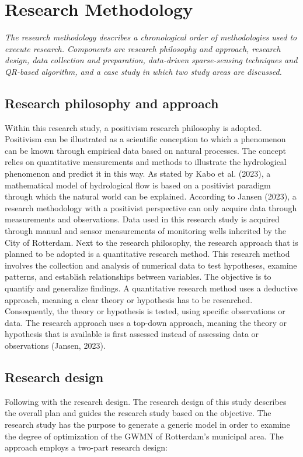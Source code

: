 \chapter{Research Methodology}
\emph{The research methodology describes a chronological order of methodologies used to execute research. Components are research philosophy and approach, research design, data collection and preparation, data-driven sparse-sensing techniques and QR-based algorithm, and a case study in which two study areas are discussed.}

\section{Research philosophy and approach}

Within this research study, a positivism research philosophy is adopted. Positivism can be illustrated as a scientific conception to which a phenomenon can be known through empirical data based on natural processes. The concept relies on quantitative measurements and methods to illustrate the hydrological phenomenon and predict it in this way. As stated by Kabo et al. (2023), a mathematical model of hydrological flow is based on a positivist paradigm through which the natural world can be explained. According to Jansen (2023), a research methodology with a positivist perspective can only acquire data through measurements and observations. Data used in this research study is acquired through manual and sensor measurements of monitoring wells inherited by the City of Rotterdam. Next to the research philosophy, the research approach that is planned to be adopted is a quantitative research method. This research method involves the collection and analysis of numerical data to test hypotheses, examine patterns, and establish relationships between variables. The objective is to quantify and generalize findings. A quantitative research method uses a deductive approach, meaning a clear theory or hypothesis has to be researched. Consequently, the theory or hypothesis is tested, using specific observations or data. The research approach uses a top-down approach, meaning the theory or hypothesis that is available is first assessed instead of assessing data or observations (Jansen, 2023).

\section{Research design}
Following with the research design. The research design of this study describes the overall plan and guides the research study based on the objective. The research study has the purpose to generate a generic model in order to examine the degree of optimization of the GWMN of Rotterdam's municipal area. The approach employs a two-part research design:

